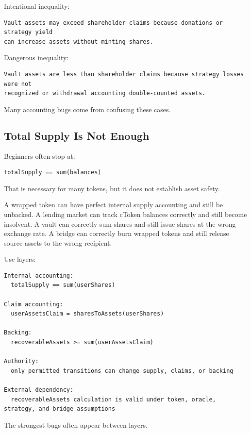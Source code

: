 Intentional inequality:

\begin{lstlisting}
Vault assets may exceed shareholder claims because donations or strategy yield
can increase assets without minting shares.
\end{lstlisting}

Dangerous inequality:

\begin{lstlisting}
Vault assets are less than shareholder claims because strategy losses were not
recognized or withdrawal accounting double-counted assets.
\end{lstlisting}

Many accounting bugs come from confusing these cases.

\subsection{Total Supply Is Not Enough}

Beginners often stop at:

\begin{lstlisting}
totalSupply == sum(balances)
\end{lstlisting}

That is necessary for many tokens, but it does not establish asset
safety.

A wrapped token can have perfect internal supply accounting and still be
unbacked. A lending market can track cToken balances correctly and still
become insolvent. A vault can correctly sum shares and still issue
shares at the wrong exchange rate. A bridge can correctly burn wrapped
tokens and still release source assets to the wrong recipient.

Use layers:

\begin{lstlisting}
Internal accounting:
  totalSupply == sum(userShares)

Claim accounting:
  userAssetsClaim = sharesToAssets(userShares)

Backing:
  recoverableAssets >= sum(userAssetsClaim)

Authority:
  only permitted transitions can change supply, claims, or backing

External dependency:
  recoverableAssets calculation is valid under token, oracle, strategy, and bridge assumptions
\end{lstlisting}

The strongest bugs often appear between layers.

